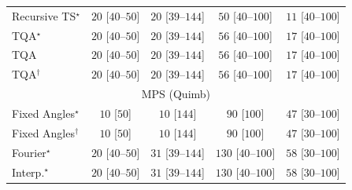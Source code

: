 \begin{tabular}{l|cccc|}
Recursive TS$^\star$ & {\cellcolor[HTML]{F5FBF2}} \color[HTML]{000000} $20$ [$40$--$50$] & {\cellcolor[HTML]{F5FBF2}} \color[HTML]{000000} $20$ [$39$--$144$] & {\cellcolor[HTML]{F0F9EC}} \color[HTML]{000000} $50$ [$40$--$100$] & {\cellcolor[HTML]{F6FCF4}} \color[HTML]{000000} $11$ [$40$--$100$] \\
TQA$^\star$ & {\cellcolor[HTML]{F5FBF2}} \color[HTML]{000000} $20$ [$40$--$50$] & {\cellcolor[HTML]{F5FBF2}} \color[HTML]{000000} $20$ [$39$--$144$] & {\cellcolor[HTML]{EFF9EB}} \color[HTML]{000000} $56$ [$40$--$100$] & {\cellcolor[HTML]{F5FBF3}} \color[HTML]{000000} $17$ [$40$--$100$] \\
TQA & {\cellcolor[HTML]{F5FBF2}} \color[HTML]{000000} $20$ [$40$--$50$] & {\cellcolor[HTML]{F5FBF2}} \color[HTML]{000000} $20$ [$39$--$144$] & {\cellcolor[HTML]{EFF9EB}} \color[HTML]{000000} $56$ [$40$--$100$] & {\cellcolor[HTML]{F5FBF3}} \color[HTML]{000000} $17$ [$40$--$100$] \\
TQA$^\dagger$ & {\cellcolor[HTML]{F5FBF2}} \color[HTML]{000000} $20$ [$40$--$50$] & {\cellcolor[HTML]{F5FBF2}} \color[HTML]{000000} $20$ [$39$--$144$] & {\cellcolor[HTML]{EFF9EB}} \color[HTML]{000000} $56$ [$40$--$100$] & {\cellcolor[HTML]{F5FBF3}} \color[HTML]{000000} $17$ [$40$--$100$] \\
\cline{1-5}
\multicolumn{5}{c}{\rule{0pt}{8pt}MPS (Quimb)} \\
\midrule
Fixed Angles$^\star$ & {\cellcolor[HTML]{F7FCF5}} \color[HTML]{000000} $10$ [$50$] & {\cellcolor[HTML]{F7FCF5}} \color[HTML]{000000} $10$ [$144$] & {\cellcolor[HTML]{E9F7E5}} \color[HTML]{000000} $90$ [$100$] & {\cellcolor[HTML]{F0F9ED}} \color[HTML]{000000} $47$ [$30$--$100$] \\
Fixed Angles$^\dagger$ & {\cellcolor[HTML]{F7FCF5}} \color[HTML]{000000} $10$ [$50$] & {\cellcolor[HTML]{F7FCF5}} \color[HTML]{000000} $10$ [$144$] & {\cellcolor[HTML]{E9F7E5}} \color[HTML]{000000} $90$ [$100$] & {\cellcolor[HTML]{F0F9ED}} \color[HTML]{000000} $47$ [$30$--$100$] \\
Fourier$^\star$ & {\cellcolor[HTML]{F5FBF2}} \color[HTML]{000000} $20$ [$40$--$50$] & {\cellcolor[HTML]{F3FAF0}} \color[HTML]{000000} $31$ [$39$--$144$] & {\cellcolor[HTML]{DFF3DA}} \color[HTML]{000000} $130$ [$40$--$100$] & {\cellcolor[HTML]{EFF9EB}} \color[HTML]{000000} $58$ [$30$--$100$] \\
Interp.$^\star$ & {\cellcolor[HTML]{F5FBF2}} \color[HTML]{000000} $20$ [$40$--$50$] & {\cellcolor[HTML]{F3FAF0}} \color[HTML]{000000} $31$ [$39$--$144$] & {\cellcolor[HTML]{DFF3DA}} \color[HTML]{000000} $130$ [$40$--$100$] & {\cellcolor[HTML]{EFF9EB}} \color[HTML]{000000} $58$ [$30$--$100$] \\

\end{tabular}
